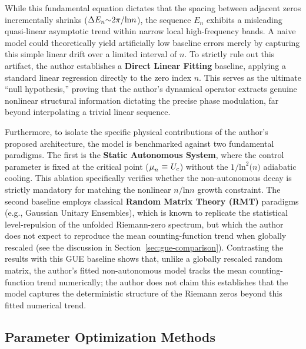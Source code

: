 \documentclass[mca,article,submit,oneauthor,pdftex]{Definitions/mdpi}
\begin{document}
While this fundamental equation dictates that the spacing between
adjacent zeros incrementally shrinks
(\(\text{\ensuremath{\Delta}}{E}_{{n}}\text{\ensuremath{\sim}2}\text{\ensuremath{\pi}}\text{/ln}{n}\)),
the sequence \({E}_{{n}}\) exhibits a misleading
quasi-linear asymptotic trend within narrow local high-frequency bands.
A naive model could theoretically yield artificially low baseline errors
merely by capturing this simple linear drift over a limited interval of
\({n}\). To strictly rule out this artifact, the author establishes a
\textbf{Direct Linear Fitting} baseline, applying a standard linear
regression directly to the zero index \({n}\). This serves as the
ultimate ``null hypothesis,'' proving that the author's dynamical operator
extracts genuine nonlinear structural information dictating the precise
phase modulation, far beyond interpolating a trivial linear sequence.

Furthermore, to isolate the specific physical contributions of the author's
proposed architecture, the model is benchmarked against two fundamental
paradigms. The first is the \textbf{Static Autonomous System}, where the
control parameter is fixed at the critical point
(\(\text{\ensuremath{\mu}}_{{n}}~\text{\ensuremath{\equiv}}~{U}_{{c}}\)) without the
\(\text{1/}\text{ln}^{\text{2}}\text{(}{n}\text{)}\) adiabatic
cooling. This ablation specifically verifies whether the non-autonomous
decay is strictly mandatory for matching the nonlinear
\({n}\text{/ln}{n}\) growth constraint. The second baseline
employs classical \textbf{Random Matrix Theory (RMT)} paradigms (e.g.,
Gaussian Unitary Ensembles), which is known to replicate the
statistical level-repulsion of the unfolded Riemann-zero spectrum, but
which the author does not expect to reproduce the mean counting-function trend when
globally rescaled (see the discussion in
Section~\ref{sec:gue-comparison}). Contrasting the results
with this GUE baseline shows that, unlike a globally rescaled random
matrix, the author's fitted non-autonomous model tracks the mean counting-function
trend numerically; the author does not claim this establishes that the model
captures the deterministic structure of the Riemann zeros beyond this
fitted numerical trend.

\subsection{Parameter Optimization Methods}
\end{document}
